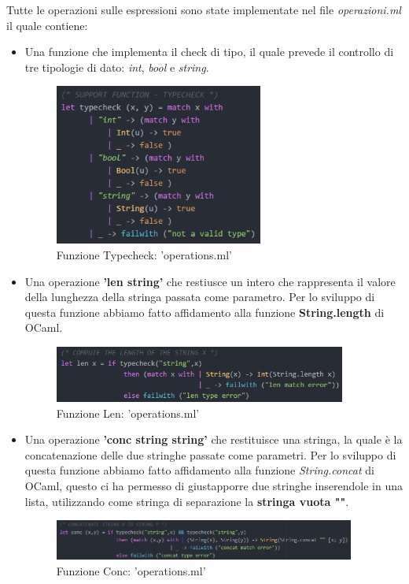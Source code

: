\documentclass[a4paper,titlepage]{book}
\begin{document}
Tutte le operazioni sulle espressioni sono state implementate nel file \textit{operazioni.ml} il quale contiene:
\begin{itemize}
\item Una funzione che implementa il check di tipo, il quale prevede il controllo di tre tipologie di dato: \textit{int}, \textit{bool} e
\textit{string}.

\begin{figure}[H]
\center
\includegraphics[height=200px]{img/typecheck.png}
\caption{Funzione Typecheck: 'operations.ml' \label{fig:typecheck}}
\end{figure}

\item Una operazione \textbf{'len string'} che restiusce un intero che rappresenta il valore della lunghezza della stringa passata come parametro.
Per lo sviluppo di questa funzione abbiamo fatto affidamento alla funzione \textbf{String.length} di OCaml.

\begin{figure}[H]
\center
\includegraphics[height=70px]{img/len.png}
\caption{Funzione Len: 'operations.ml' \label{fig:len}}
\end{figure}
\clearpage

\item Una operazione \textbf{'conc string string'} che restituisce una stringa, la quale \`e la concatenazione delle due stringhe passate come parametri.
Per lo sviluppo di questa funzione abbiamo fatto affidamento alla funzione \textit{String.concat} di OCaml, questo ci ha permesso di giustapporre due stringhe inserendole in una lista, utilizzando come stringa di separazione la \textbf{stringa vuota ""}.

\begin{figure}[H]
\center
\includegraphics[height=50px]{img/conc.png}
\caption{Funzione Conc: 'operations.ml' \label{fig:conc}}
\end{figure}


\end{itemize}
\end{document}
